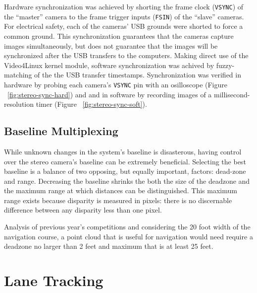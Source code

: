 \documentclass[11pt,twocolumn]{article}
\begin{document}
Hardware synchronization was achieved by  shorting the frame clock
(\texttt{VSYNC}) of the ``master'' camera to the frame trigger inputs
(\texttt{FSIN}) of the ``slave'' cameras. For electrical safety, each of the
cameras' USB grounds were shorted to force a common ground. This synchronization
guarantees that the cameras capture images simultaneously, but does not
guarantee that the images will be synchronized after the USB transfers to the
computers. Making direct use of the Video4Linux kernel module, software
synchronization was achived by fuzzy-matching of the the USB transfer
timestamps. Synchronization was verified in hardware by probing each camera's
\texttt{VSYNC} pin with an osilloscope (Figure ~\ref{fig:stereo-sync-hard}) and 
and in software by recording images of a millisecond-resolution timer (Figure
~\ref{fig:stereo-sync-soft}).

\subsection{Baseline Multiplexing}
\label{sec:stereo-mux}
While unknown changes in the system's baseline is disasterous, having control
over the stereo camera's baseline can be extremely beneficial. Selecting the
best baseline is a balance of two opposing, but equally important, factors:
dead-zone and range. Decreasing the baseline shrinks the both the size of the
deadzone and the maximum range at which distances can be distinguished. This
maximum range exists because disparity is measured in pixels: there is no
discernable difference between any disparity less than one pixel.

Analysis of previous year's competitions and considering the 20 foot width of
the navigation course, a point cloud that is useful for navigation would need
require a deadzone no larger than 2 feet and maximum that is at least 25 feet.


\section{Lane Tracking}
\label{sec:lane}
\end{document}
